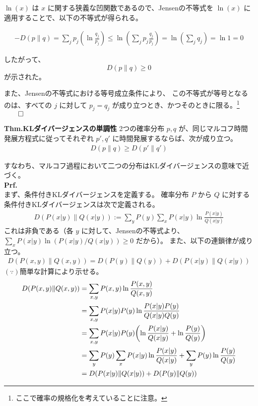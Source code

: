 \documentclass[a4paper,11pt]{jsarticle}
\numberwithin{equation}{section}
\begin{document}
$\ln(x)$ は $x$ に関する狭義な凹関数であるので、Jensenの不等式を $\ln(x)$ に適用することで、以下の不等式が得られる。

\begin{align}
- D(p \| q)
= \sum_j p_j \left( \ln \frac{q_j}{p_j} \right)
\leq \ln \left( \sum_j p_j \frac{q_j}{p_j} \right)
= \ln \left( \sum_j q_j \right)
= \ln 1 = 0
\end{align}

したがって、
\[
D(p \| q) \geq 0
\]
が示された。

また、Jensenの不等式における等号成立条件により、
この不等式が等号となるのは、すべての $j$ に対して $p_j = q_j$ が成り立つとき、かつそのときに限る。\footnote{ここで確率の規格化を考えていることに注意。}$\qed$\\

\begin{itembox}[l]{\textbf{Thm.KLダイバージェンスの単調性}}
    2つの確率分布 $p, q$ が、同じマルコフ時間発展方程式に従ってそれぞれ $p', q'$ に時間発展するならば、次が成り立つ。
\begin{align}
D(p \| q) \geq D(p' \| q')
\end{align}
\end{itembox}
すなわち、マルコフ過程において二つの分布はKLダイバージェンスの意味で近づく。\\
\textbf{Prf.}  \\
まず、条件付きKLダイバージェンスを定義する。
確率分布 $P$ から $Q$ に対する条件付きKLダイバージェンスは次で定義される。
\begin{align}
D(P(x | y) \| Q(x | y)) := \sum_y P(y) \sum_x P(x | y)
\ln \frac{P(x | y)}{Q(x | y)}
\end{align}
これは非負である（各 $y$ に対して、Jensenの不等式より、
$\sum_x P(x | y) \ln (P(x | y)/Q(x | y)) \geq 0$ だから）。
また、以下の連鎖律が成り立つ。
\begin{align}
D(P(x, y) \| Q(x, y)) = D(P(y) \| Q(y)) + D(P(x | y) \| Q(x | y))
\end{align}
$(\because)$簡単な計算により示せる。\\
\begin{align}
D(P(x, y) \| Q(x, y))
&= \sum_{x, y} P(x, y) \ln \frac{P(x, y)}{Q(x, y)} \\
&= \sum_{x, y} P(x | y) P(y) \ln \frac{P(x | y) P(y)}{Q(x | y) Q(y)} \\
&= \sum_{x, y} P(x | y) P(y) \qty(\ln \frac{P(x | y)}{Q(x | y)} + \ln \frac{P(y)}{Q(y)}) \\
&= \sum_y P(y) \sum_x P(x | y) \ln \frac{P(x | y)}{Q(x | y)} + \sum_y P(y) \ln \frac{P(y)}{Q(y)} \\
&= D(P(x | y) \| Q(x | y)) + D(P(y) \| Q(y))
\end{align}
\end{document}
